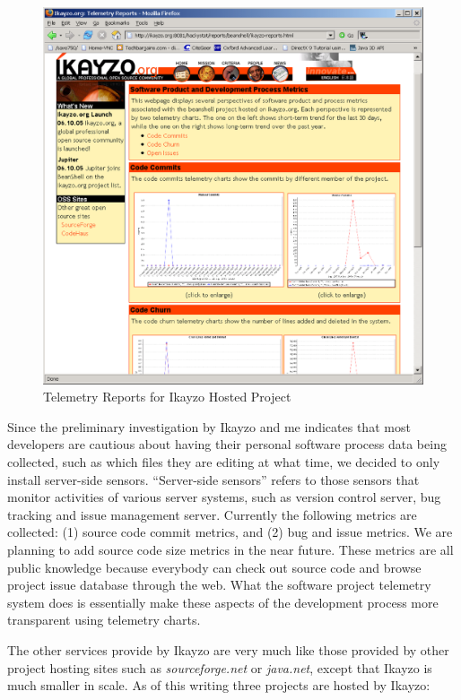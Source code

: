 \begin{figure}[p]
  \includegraphics[width=1.00\textwidth]{figures/IkayzoTelemetryReports}
  \caption{Telemetry Reports for Ikayzo Hosted Project} 
  \label{fig:IkayzoTelemetryReport}
\end{figure}

Since the preliminary investigation by Ikayzo and me indicates that most developers are cautious about having their personal software process data being collected, such as which files they are editing at what time, we decided to only install server-side sensors. ``Server-side sensors'' refers to those sensors that monitor activities of various server systems, such as version control server, bug tracking and issue management server. Currently the following metrics are collected: (1) source code commit metrics, and (2) bug and issue metrics. We are planning to add source code size metrics in the near future. These metrics are all public knowledge because everybody can check out source code and browse project issue database through the web. What the software project telemetry system does is essentially make these aspects of the development process more transparent using telemetry charts.


The other services provide by Ikayzo are very much like those provided by other project hosting sites such as \textit{sourceforge.net} or \textit{java.net}, except that Ikayzo is much smaller in scale. As of this writing three projects are hosted by Ikayzo:

